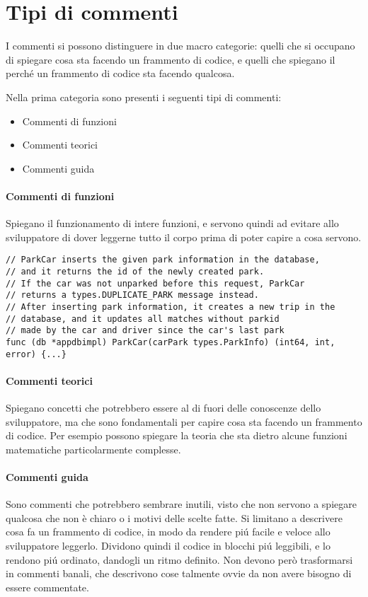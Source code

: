 \documentclass[italian, oneside]{sapthesis} %
\begin{document}
	\section{Tipi di commenti}
		I commenti si possono distinguere in due macro categorie: quelli che si occupano di spiegare cosa sta facendo un frammento di codice, e quelli che spiegano il perch\'e un frammento di codice sta facendo qualcosa.

		Nella prima categoria sono presenti i seguenti tipi di commenti: 
		\begin{itemize}
			\item Commenti di funzioni
			\item Commenti teorici
			\item Commenti guida
		\end{itemize}

		\paragraph*{Commenti di funzioni} Spiegano il funzionamento di intere funzioni, e servono quindi ad evitare allo sviluppatore di dover leggerne tutto il corpo prima di poter capire a cosa servono. 
		\begin{lstlisting}
// ParkCar inserts the given park information in the database, 
// and it returns the id of the newly created park.
// If the car was not unparked before this request, ParkCar 
// returns a types.DUPLICATE_PARK message instead.
// After inserting park information, it creates a new trip in the
// database, and it updates all matches without parkid
// made by the car and driver since the car's last park
func (db *appdbimpl) ParkCar(carPark types.ParkInfo) (int64, int, error) {...}
		\end{lstlisting}

		\paragraph*{Commenti teorici} Spiegano concetti che potrebbero essere al di fuori delle conoscenze dello sviluppatore, ma che sono fondamentali per capire cosa sta facendo un frammento di codice. Per esempio possono spiegare la teoria che sta dietro alcune funzioni matematiche particolarmente complesse.
		
		\paragraph*{Commenti guida} Sono commenti che potrebbero sembrare inutili, visto che non servono a spiegare qualcosa che non \`e chiaro o i motivi delle scelte fatte. Si limitano a descrivere cosa fa un frammento di codice, in modo da rendere pi\'u facile e veloce allo sviluppatore leggerlo. Dividono quindi il codice in blocchi pi\'u leggibili, e lo rendono pi\'u ordinato, dandogli un ritmo definito. Non devono per\`o trasformarsi in commenti banali, che descrivono cose talmente ovvie da non avere bisogno di essere commentate.
\end{document}
